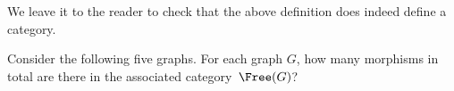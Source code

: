 

We leave it to the reader to check that the above definition does indeed define a category.




\begin{exercise}
  Consider the following five graphs. For each graph $G$, how many morphisms in total are there in the associated category~$\Free(G)$?

  \begin{center}
  \end{center}
\end{exercise}
\begin{solution}
\end{solution}
